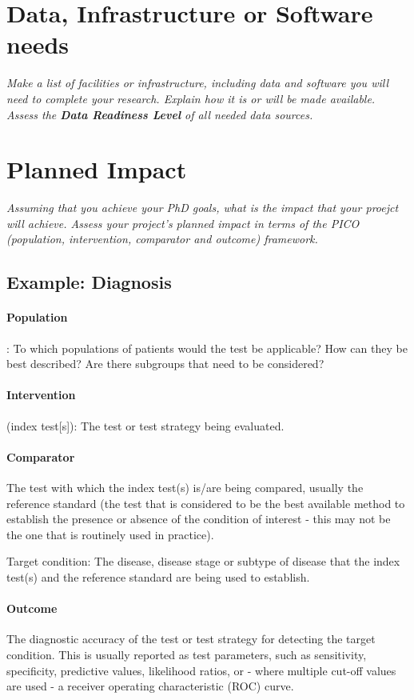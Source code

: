 \section{Data, Infrastructure or Software needs}
\emph{Make a list of facilities or infrastructure, including data and software you will need to complete your research. Explain how it is or will be made available. Assess the \textbf{Data Readiness Level} of all needed data sources.}

\section{Planned Impact}
\emph{Assuming that you achieve your PhD goals, what is the impact that your proejct will achieve. Assess your project's planned impact in terms of the PICO (population, intervention, comparator and outcome) framework.}

\subsection*{Example: Diagnosis}
\paragraph{Population}: To which populations of patients would the test be applicable? How can they be best described? Are there subgroups that need to be considered?

\paragraph{Intervention} (index test[s]): The test or test strategy being evaluated.

\paragraph{Comparator} The test with which the index test(s) is/are being compared, usually the reference standard (the test that is considered to be the best available method to establish the presence or absence of the condition of interest - this may not be the one that is routinely used in practice).

Target condition: The disease, disease stage or subtype of disease that the index test(s) and the reference standard are being used to establish.

\paragraph{Outcome} The diagnostic accuracy of the test or test strategy for detecting the target condition. This is usually reported as test parameters, such as sensitivity, specificity, predictive values, likelihood ratios, or - where multiple cut-off values are used - a receiver operating characteristic (ROC) curve.

